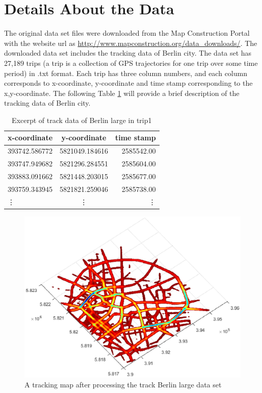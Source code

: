 \documentclass[11pt]{article}
\begin{document}
\section*{Details About the Data}
The original data set files were downloaded from the Map Construction Portal with the website url as \url{http://www.mapconstruction.org/data_downloads/}.  The downloaded data set includes the tracking data of Berlin city. The data set has 27,189 trips (a trip is a collection of GPS trajectories for one trip over some time period) in .txt format. Each trip has three column numbers, and each column corresponds to x-coordinate, y-coordinate and time stamp corresponding to the x,y-coordinate. The following Table \ref{table:questions} will provide a brief description of the tracking data of Berlin city.
\begin{table}
\begin{center}
\begin{tabular}{ |l |c| r| }
\hline
  x-coordinate & y-coordinate & time stamp   \\ \hline
  393742.586772 & 5821049.184616 & 2585542.00   \\ \hline
  393747.949682 & 5821296.284551 & 2585604.00 \\  \hline
  393883.091662 & 5821448.203015 & 2585677.00  \\ \hline
  393759.343945 & 5821821.259046 & 2585738.00\\ \hline
  \vdots & \vdots & \vdots \\ \hline
\end{tabular}
\end{center}
\caption{Excerpt of track data of Berlin large in trip1}
\label{table:questions}
\end{table}

\begin{figure}[h!]
  \caption{A tracking map after processing the track Berlin large data set}
  \centering
 \includegraphics[scale=0.8]{p1.eps} 
\end{figure}
\end{document}
